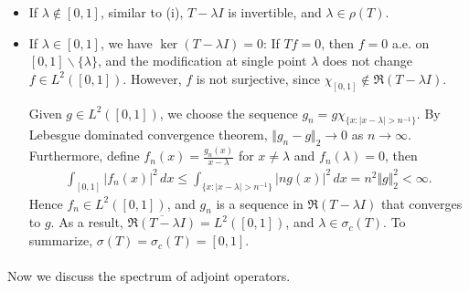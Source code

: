 \documentclass{article}
\begin{document}
\begin{itemize}
	\vspace{0.1cm}
	\item If $\lambda\notin [0,1]$, similar to (i), $T-\lambda I$ is invertible, and $\lambda\in\rho(T)$.
	\vspace{0.1cm}
	\item If $\lambda\in [0,1]$, we have $\ker(T-\lambda I)=0$: If $Tf=0$, then $f=0$ a.e. on $[0,1]\backslash\{\lambda\}$, and the modification at single point $\lambda$ does not change $f\in L^2([0,1])$. However, $f$ is not surjective, since $\chi_{[0,1]}\notin\mathfrak{R}(T-\lambda I)$.
	
	Given $g\in L^2([0,1])$, we choose the sequence $g_n = g\chi_{\{x:\vert x-\lambda\vert > n^{-1}\}}$. By Lebesgue dominated convergence theorem, $\Vert g_n-g\Vert_2\to 0$ as $n\to\infty$. Furthermore, define $f_n(x) = \frac{g_n(x)}{x-\lambda}$ for $x\neq\lambda$ and $f_n(\lambda)=0$, then
	\begin{align*}
		\int_{[0,1]} \vert f_n(x)\vert^2\,dx \leq \int_{\{x:\vert x-\lambda\vert > n^{-1}\}}\vert ng(x)\vert^2\,dx = n^2\Vert g\Vert_2^2 < \infty.
	\end{align*}
    Hence $f_n\in L^2([0,1])$, and $g_n$ is a sequence in $\mathfrak{R}(T-\lambda I)$ that converges to $g$. As a result, $\overline{\mathfrak{R}(T-\lambda I)}=L^2([0,1])$, and $\lambda\in\sigma_c(T)$. To summarize, $\sigma(T)=\sigma_c(T)=[0,1]$.
\end{itemize}

\paragraph{} Now we discuss the spectrum of adjoint operators.
\end{document}
